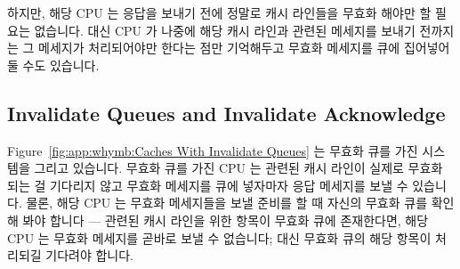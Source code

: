 하지만, 해당 CPU 는 응답을 보내기 전에 정말로 캐시 라인들을 무효화 해야만 할
필요는 없습니다.
대신 CPU 가 나중에 해당 캐시 라인과 관련된 메세지를 보내기 전까지는 그 메세지가
처리되어야만 한다는 점만 기억해두고 무효화 메세지를 큐에 집어넣어 둘 수도
있습니다.
\iffalse

One reason that invalidate acknowledge messages can take so long
is that they must ensure that the corresponding cache line is
actually invalidated, and this invalidation can be delayed if
the cache is busy, for example, if the CPU is intensively loading
and storing data, all of which resides in the cache.
In addition, if a large number of invalidate messages arrive
in a short time period, a given CPU might fall behind in processing
them, thus possibly stalling all the other CPUs.

However, the CPU need not actually invalidate the cache line
before sending the acknowledgement.
It could instead queue the invalidate message with the understanding
that the message will be processed before the CPU sends any further
messages regarding that cache line.
\fi

\subsection{Invalidate Queues and Invalidate Acknowledge}
\label{sec:app:whymb:Invalidate Queues and Invalidate Acknowledge}

Figure~\ref{fig:app:whymb:Caches With Invalidate Queues} 는 무효화 큐를 가진
시스템을 그리고 있습니다.
무효화 큐를 가진 CPU 는 관련된 캐시 라인이 실제로 무효화 되는 걸 기다리지 않고
무효화 메세지를 큐에 넣자마자 응답 메세지를 보낼 수 있습니다.
물론, 해당 CPU 는 무효화 메세지들을 보낼 준비를 할 때 자신의 무효화 큐를 확인해
봐야 합니다 --- 관련된 캐시 라인을 위한 항목이 무효화 큐에 존재한다면, 해당 CPU
는 무효화 메세지를 곧바로 보낼 수 없습니다; 대신 무효화 큐의 해당 항목이
처리되길 기다려야 합니다.
\iffalse

Figure~\ref{fig:app:whymb:Caches With Invalidate Queues}
shows a system with invalidate queues.
A CPU with an invalidate queue may acknowledge an invalidate message
as soon as it is placed in the queue, instead of having to wait until
the corresponding line is actually invalidated.
Of course, the CPU must refer to its invalidate queue when preparing
to transmit invalidation messages---if an entry for the corresponding
cache line is in the invalidate queue, the CPU cannot immediately
transmit the invalidate message; it must instead wait until the
invalidate-queue entry has been processed.
\fi

